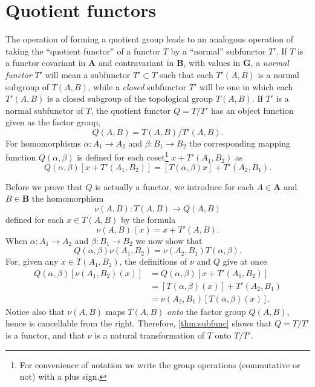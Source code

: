 \documentclass[11pt,a4paper]{report}
\begin{document}
\section{Quotient functors}\label{sec:quot_funct}
The operation of forming a quotient group leads to an analogous operation of taking the ``quotient functor'' of a
functor $T$ by a ``normal'' subfunctor $T'$. If $T$ is a functor covariant in $\mathbf{A}$ and contravariant in
$\mathbf{B}$, with values in $\mathbf{G}$, a \emph{normal functor} $T'$ will mean a subfunctor $T'\subset T$
such that each $T'(A,B)$ is a normal subgroup of $T(A,B)$, while a \emph{closed} subfunctor $T'$ will be one
in which each $T'(A,B)$ is a closed subgroup of the topological group $T(A,B)$. If $T'$ is a normal subfunctor
of $T$, the quotient functor $Q= T/T'$ has an object function given as the factor group,
\begin{equation*}
	Q(A,B)= T(A,B)/T'(A,B).
\end{equation*}
For homomorphisms $\alpha:A_1\rightarrow A_2$ and $\beta:B_1\rightarrow B_2$ the corresponding mapping function
$Q(\alpha,\beta)$ is defined for each coset\footnote{For convenience of notation we write the group operations 
(commutative or not) with a plus sign.} $x+T'(A_1,B_2)$ as
\begin{equation*}
	Q(\alpha,\beta)[x+T'(A_1,B_2)]= [T(\alpha,\beta)x]+T'(A_2,B_1).
\end{equation*}

Before we prove that $Q$ is actually a functor, we introduce for each $A\in\mathbf{A}$ and $B\in\mathbf{B}$
the homomorphism
\begin{equation*}
	\nu(A,B):T(A,B)\rightarrow Q(A,B)
\end{equation*}
defined for each $x\in T(A,B)$ by the formula
\begin{equation*}
	\nu(A,B)(x) = x + T'(A,B).
\end{equation*}
When $\alpha:A_1\rightarrow A_2$ and $\beta:B_1\rightarrow B_2$ we now show that
\begin{equation*}
	Q(\alpha,\beta)\nu(A_1,B_2) = \nu(A_2,B_1)T(\alpha,\beta).
\end{equation*}
For, given any $x\in T(A_1,B_2)$, the definitions of $\nu$ and $Q$ give at once
\begin{align*}
	Q(\alpha,\beta)[\nu(A_1,B_2)(x)] & = Q(\alpha,\beta)[x+T'(A_1,B_2)]\\
	&= [T(\alpha,\beta)(x)]+T'(A_2,B_1)\\
	&= \nu(A_2,B_1)[T(\alpha,\beta)(x)].
\end{align*}
Notice also that $\nu(A,B)$ maps $T(A,B)$ \emph{onto} the factor group $Q(A,B)$, hence is cancellable from the right.
Therefore, \cref{thm:subfunc} shows that $Q=T/T'$ is a functor, and that $\nu$ is a natural transformation of $T$
onto $T/T'$.
\end{document}
